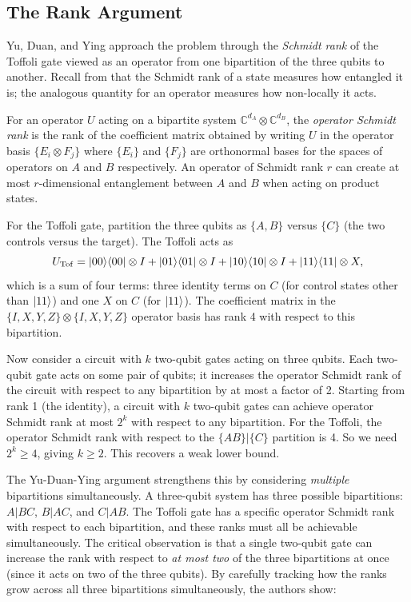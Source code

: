 \documentclass[12pt, a4paper, oneside]{report}
\theoremstyle{plain}
\theoremstyle{definition}
\theoremstyle{remark}
\newcommand{\CC}{\mathbb{C}}
\begin{document}
\subsection{The Rank Argument}

Yu, Duan, and Ying approach the problem through the \emph{Schmidt rank} of the Toffoli
gate viewed as an operator from one bipartition of the three qubits to another. Recall from
 that the Schmidt rank of a state measures how entangled it is; the
analogous quantity for an operator measures how non-locally it acts.

For an operator $U$ acting on a bipartite system $\CC^{d_A} \otimes \CC^{d_B}$, the
\emph{operator Schmidt rank} is the rank of the coefficient matrix obtained by writing $U$
in the operator basis $\{E_i \otimes F_j\}$ where $\{E_i\}$ and $\{F_j\}$ are orthonormal
bases for the spaces of operators on $A$ and $B$ respectively. An operator of Schmidt rank
$r$ can create at most $r$-dimensional entanglement between $A$ and $B$ when acting on
product states.

For the Toffoli gate, partition the three qubits as $\{A, B\}$ versus $\{C\}$ (the two
controls versus the target). The Toffoli acts as
\[
  U_{\mathrm{Tof}} = \ket{00}\!\bra{00} \otimes I
                   + \ket{01}\!\bra{01} \otimes I
                   + \ket{10}\!\bra{10} \otimes I
                   + \ket{11}\!\bra{11} \otimes X,
\]
which is a sum of four terms: three identity terms on $C$ (for control states other than
$\ket{11}$) and one $X$ on $C$ (for $\ket{11}$). The coefficient matrix in the $\{I, X, Y, Z\}
\otimes \{I, X, Y, Z\}$ operator basis has rank 4 with respect to this bipartition.

Now consider a circuit with $k$ two-qubit gates acting on three qubits. Each two-qubit gate
acts on some pair of qubits; it increases the operator Schmidt rank of the circuit with
respect to any bipartition by at most a factor of 2. Starting from rank 1 (the identity),
a circuit with $k$ two-qubit gates can achieve operator Schmidt rank at most $2^k$ with
respect to any bipartition. For the Toffoli, the operator Schmidt rank with respect to the
$\{AB\}|\{C\}$ partition is 4. So we need $2^k \geq 4$, giving $k \geq 2$. This recovers a
weak lower bound.

The Yu-Duan-Ying argument strengthens this by considering \emph{multiple} bipartitions
simultaneously. A three-qubit system has three possible bipartitions: $A|BC$, $B|AC$, and
$C|AB$. The Toffoli gate has a specific operator Schmidt rank with respect to each
bipartition, and these ranks must all be achievable simultaneously. The critical observation
is that a single two-qubit gate can increase the rank with respect to \emph{at most two} of
the three bipartitions at once (since it acts on two of the three qubits). By carefully
tracking how the ranks grow across all three bipartitions simultaneously, the authors show:
\end{document}
